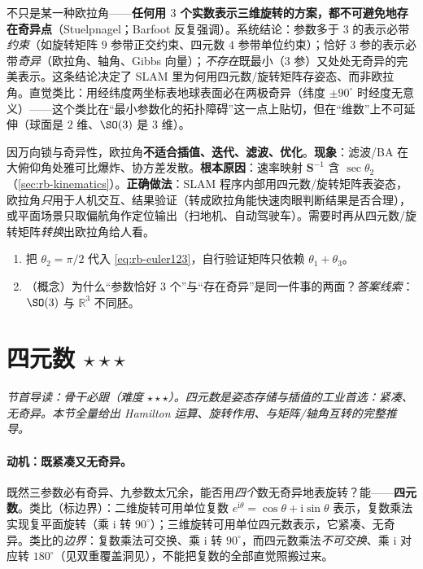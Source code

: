 \begin{insight}
不只是某一种欧拉角——\textbf{任何用 $3$ 个实数表示三维旋转的方案，都不可避免地存在奇异点}（Stuelpnagel\cite{stuelpnagel1964parametrization}；Barfoot\cite{barfoot2024state} 反复强调）。系统结论：参数多于 $3$ 的表示必带\emph{约束}（如旋转矩阵 $9$ 参带正交约束、四元数 $4$ 参带单位约束）；恰好 $3$ 参的表示必带\emph{奇异}（欧拉角、轴角、Gibbs 向量）；\emph{不存在}既最小（$3$ 参）又处处无奇异的完美表示。这条结论决定了 SLAM 里为何用四元数/旋转矩阵存姿态、而非欧拉角。直觉类比：用经纬度两坐标表地球表面必在两极奇异（纬度 $\pm90^\circ$ 时经度无意义）——这个类比在“最小参数化的拓扑障碍”这一点上贴切，但在“维数”上不可延伸（球面是 $2$ 维、$\SO(3)$ 是 $3$ 维）。
\end{insight}

\begin{pitfall}
因万向锁与奇异性，欧拉角\textbf{不适合插值、迭代、滤波、优化}。\textbf{现象}：滤波/BA 在大俯仰角处雅可比爆炸、协方差发散。\textbf{根本原因}：速率映射 $\mathbf{S}^{-1}$ 含 $\sec\theta_2$（\cref{sec:rb-kinematics}）。\textbf{正确做法}：SLAM 程序内部用四元数/旋转矩阵表姿态，欧拉角\emph{只}用于人机交互、结果验证（转成欧拉角能快速肉眼判断结果是否合理），或平面场景只取偏航角作定位输出（扫地机、自动驾驶车）。需要时再从四元数/旋转矩阵\emph{转换}出欧拉角给人看。
\end{pitfall}

\begin{practice}
\begin{enumerate}
  \item 把 $\theta_2=\pi/2$ 代入 \cref{eq:rb-euler123}，自行验证矩阵只依赖 $\theta_1+\theta_3$。
  \item （概念）为什么“参数恰好 $3$ 个”与“存在奇异”是同一件事的两面？\emph{答案线索}：$\SO(3)$ 与 $\mathbb{R}^3$ 不同胚。
\end{enumerate}
\end{practice}

\section{四元数 \texorpdfstring{$\star\star\star$}{***}}
\label{sec:rb-quat}
\noindent\emph{节首导读：骨干必跟（难度 $\star\star\star$）。四元数是姿态\emph{存储与插值}的工业首选：紧凑、无奇异。本节全量给出 Hamilton 运算、旋转作用、与矩阵/轴角互转的完整推导。}

\paragraph{动机：既紧凑又无奇异。}既然三参数必有奇异、九参数太冗余，能否用\emph{四个}数无奇异地表旋转？能——\textbf{四元数}\cite{gaoxiang2019slam14}。类比（标边界）：二维旋转可用单位复数 $e^{\mathrm{i}\theta}=\cos\theta+\mathrm{i}\sin\theta$ 表示，复数乘法实现复平面旋转（乘 $\mathrm{i}$ 转 $90^\circ$）；三维旋转可用单位四元数表示，它紧凑、无奇异。类比的\emph{边界}：复数乘法可交换、乘 $\mathrm{i}$ 转 $90^\circ$，而四元数乘法\emph{不可交换}、乘 $\mathrm{i}$ 对应转 $180^\circ$（见双重覆盖洞见），不能把复数的全部直觉照搬过来。

